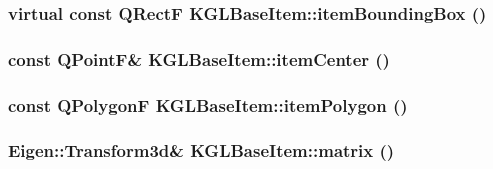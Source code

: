 \hypertarget{class_k_g_l_base_item_0b12fe848be4194ccd67464d63ab4d25}{
\subsubsection[{itemBoundingBox}]{\setlength{\rightskip}{0pt plus 5cm}virtual const QRectF KGLBaseItem::itemBoundingBox ()}}
\label{class_k_g_l_base_item_0b12fe848be4194ccd67464d63ab4d25}


\hypertarget{class_k_g_l_base_item_36470fb553034ab369b5d9349f2590ca}{
\subsubsection[{itemCenter}]{\setlength{\rightskip}{0pt plus 5cm}const QPointF\& KGLBaseItem::itemCenter ()}}
\label{class_k_g_l_base_item_36470fb553034ab369b5d9349f2590ca}


\hypertarget{class_k_g_l_base_item_9f428b73219decd7b0682db7baab258c}{
\subsubsection[{itemPolygon}]{\setlength{\rightskip}{0pt plus 5cm}const QPolygonF KGLBaseItem::itemPolygon ()}}
\label{class_k_g_l_base_item_9f428b73219decd7b0682db7baab258c}


\hypertarget{class_k_g_l_base_item_a42b375ad542d3e64eb7aee95d9e6385}{
\subsubsection[{matrix}]{\setlength{\rightskip}{0pt plus 5cm}Eigen::Transform3d\& KGLBaseItem::matrix ()}}
\label{class_k_g_l_base_item_a42b375ad542d3e64eb7aee95d9e6385}


